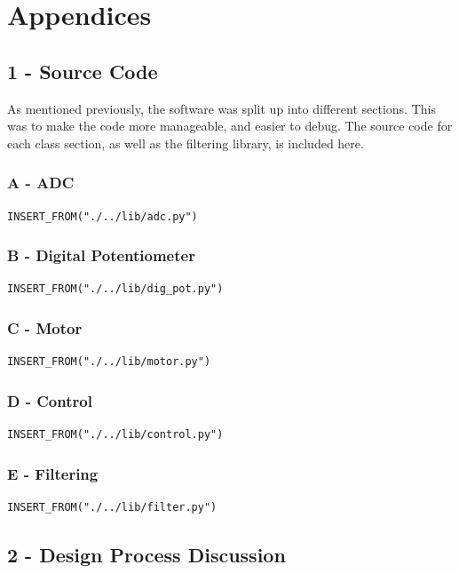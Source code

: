 \documentclass[twoside,a4]{report}
\def\shorttitle{Development of a Rheometer Controller}
\def\achapter{\shorttitle}  %
\begin{document}


\appendix


\chapter*{Appendices}
\def\achapter{Appendices}
\setcounter{page}{1}
\setcounter{section}{1}

\section{1 - Source Code} \label{apxsrc}
As mentioned previously, the software was split up into different sections. This was to make the code more manageable, and easier to debug. The source code for each class section, as well as the filtering library, is included here.
\subsection*{A - ADC}
\begin{verbatim}
INSERT_FROM("./../lib/adc.py")
\end{verbatim}
\subsection*{B - Digital Potentiometer}
\begin{verbatim}
INSERT_FROM("./../lib/dig_pot.py")
\end{verbatim}
\subsection*{C - Motor}
\begin{verbatim}
INSERT_FROM("./../lib/motor.py")
\end{verbatim}
\subsection*{D - Control}
\begin{verbatim}
INSERT_FROM("./../lib/control.py")
\end{verbatim}
\subsection*{E - Filtering}
\begin{verbatim}
INSERT_FROM("./../lib/filter.py")
\end{verbatim}
\section{2 - Design Process Discussion}
\end{document}
